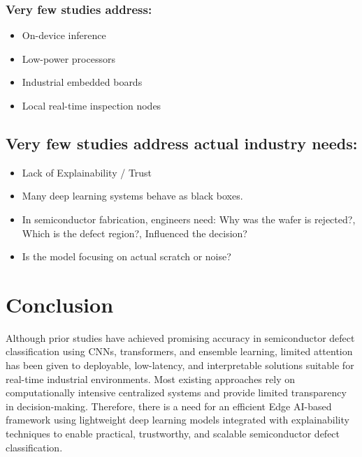 \subsubsection{ Very few studies address:}
 \begin{itemize}
     \item On-device inference
     \item Low-power processors
     \item Industrial embedded boards
     \item Local real-time inspection nodes
\end{itemize}

\subsection{Very few studies address actual industry needs:}
 \begin{itemize}
     \item Lack of Explainability / Trust
     \item Many deep learning systems behave as black boxes.
     \item In semiconductor fabrication, engineers need: Why was the wafer is rejected?, Which is the defect region?, Influenced the decision?
     \item Is the model focusing on actual scratch or noise?
\end{itemize}

\section{Conclusion}
Although prior studies have achieved promising accuracy in semiconductor defect classification using CNNs, transformers, and ensemble learning, limited attention has been given to deployable, 
low-latency, and interpretable solutions suitable for real-time industrial environments. Most existing approaches rely on computationally intensive centralized systems and provide limited transparency 
in decision-making. Therefore, there is a need for an efficient Edge AI-based framework using lightweight deep learning models integrated with explainability techniques to enable practical, trustworthy, 
and scalable semiconductor defect classification.
